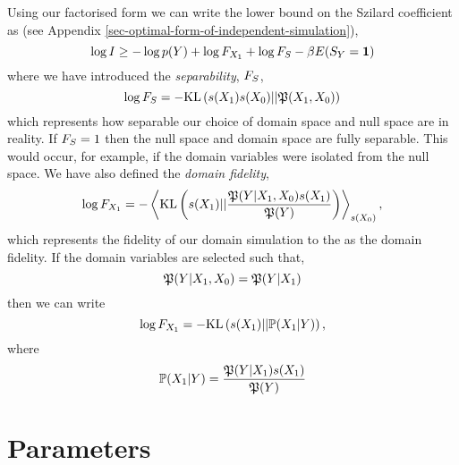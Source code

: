 \documentclass[]{article}
\begin{document}
Using our factorised form we can write the lower bound on the Szilard coefficient as (see Appendix \ref{sec-optimal-form-of-independent-simulation}),
$$
\log I \geq -\log p(Y) + \log F_{X_1}  + \log {F_S}  -\beta E(S_Y=\textbf{1})
$$
where we have introduced the \emph{separability}, ${F_S}$,
$$
\log {F_S} = - \text{KL}\left(s({X_1})s({X_0})||\mathfrak{P}({X_1},{X_0})\right)
$$
which represents how separable our choice of domain space and null space are in reality. If ${F_S}=1$ then the null space and domain space are fully separable. This would occur, for example, if the domain variables were isolated from the null space. We have also defined the \emph{domain fidelity},
$$
\log F_{X_1} = - \left\langle \text{KL}\left(s({X_1}) || \frac{\mathfrak{P}(Y | {X_1},{X_0})s({X_1})}{\mathfrak{P}(Y)}\right) \right\rangle_{s({X_0})},
$$
which represents the fidelity of our domain simulation to the as the domain fidelity. If the domain variables are selected such that,
$$
\mathfrak{P}(Y | {X_1}, {X_0}) = \mathfrak{P}(Y |{X_1})
$$
then we can write
$$
\log F_{X_1} = - \text{KL}\left(s({X_1}) || \mathbb{P}({X_1} | Y) \right),
$$
where
$$
\mathbb{P}({X_1} | Y) = \frac{\mathfrak{P}(Y | {X_1})s({X_1})}{\mathfrak{P}(Y)}
$$

\section{Parameters}
\end{document}
